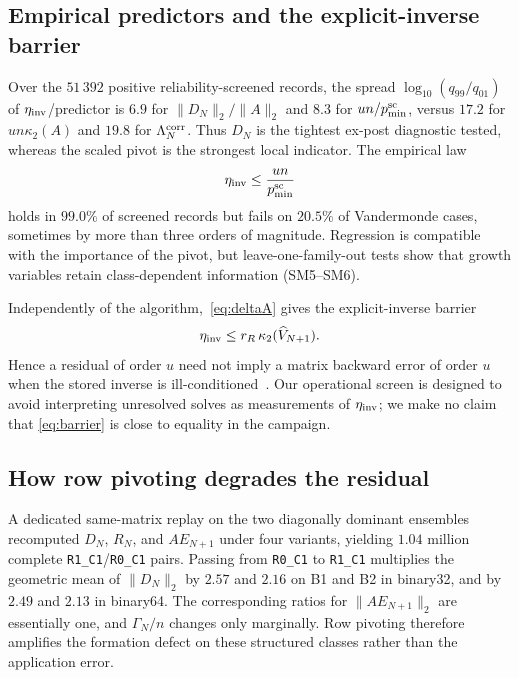 \documentclass[review,onefignum,onetabnum]{siamart251216}
\begin{document}
\subsection{Empirical predictors and the explicit-inverse barrier}
\label{sec:predictors}

Over the $51\,392$ positive reliability-screened records, the spread
$\log_{10}(q_{99}/q_{01})$ of $\eta_{\rm inv}$/predictor is $6.9$ for
$\|D_N\|_2/\|A\|_2$ and $8.3$ for $un/p_{\min}^{\rm sc}$, versus $17.2$ for
$un\kappa_2(A)$ and $19.8$ for $\Lambda_N^{\rm corr}$.  Thus $D_N$ is the tightest ex-post
diagnostic tested, whereas the scaled pivot is the strongest local indicator.  The empirical law
\begin{equation}\label{eq:empirical-law}
\eta_{\rm inv}\le\frac{un}{p_{\min}^{\rm sc}}
\end{equation}
holds in $99.0\%$ of screened records but fails on $20.5\%$ of Vandermonde cases, sometimes by more
than three orders of magnitude.  Regression is compatible with the importance of the pivot, but
leave-one-family-out tests show that growth variables retain class-dependent information (SM5--SM6).

Independently of the algorithm,~\eqref{eq:deltaA} gives the explicit-inverse barrier
\begin{equation}\label{eq:barrier}
\eta_{\rm inv}\le r_R\,\kappa_2(\widehat V_{N+1}).
\end{equation}
Hence a residual of order $u$ need not imply a matrix backward error of order $u$ when the stored
inverse is ill-conditioned~\cite{DuCrozHigham1992,Higham2002}.  Our operational screen is designed
to avoid interpreting unresolved solves as measurements of $\eta_{\rm inv}$; we make no claim that
\eqref{eq:barrier} is close to equality in the campaign.

\subsection{How row pivoting degrades the residual}
\label{sec:masking}

A dedicated same-matrix replay on the two diagonally dominant ensembles recomputed $D_N$, $R_N$,
and $AE_{N+1}$ under four variants, yielding $1.04$ million complete
\texttt{R1\_C1}/\texttt{R0\_C1} pairs.  Passing from \texttt{R0\_C1} to \texttt{R1\_C1}
multiplies the geometric mean of $\|D_N\|_2$ by $2.57$ and $2.16$ on B1 and B2 in binary32, and by
$2.49$ and $2.13$ in binary64.  The corresponding ratios for $\|AE_{N+1}\|_2$ are essentially one,
and $\Gamma_N/n$ changes only marginally.  Row pivoting therefore amplifies the formation defect on
these structured classes rather than the application error.
\end{document}
